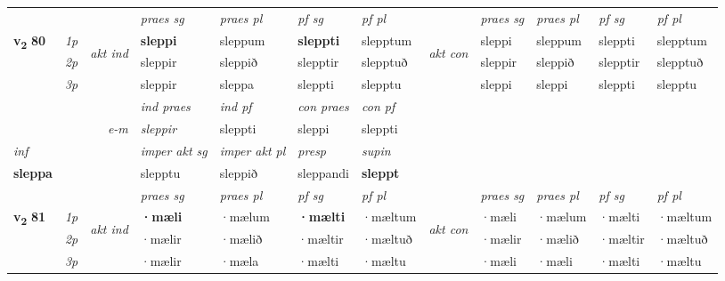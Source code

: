 \begin{longtable}[l]{X>{\footnotesize\itshape}llXXXXlXXXX}
 & &   & \textit{praes sg}  & \textit{praes pl}    & \textit{ pf sg} & \textit{pf pl} & & \textit{praes sg}  & \textit{praes pl}    & \textit{pf sg} & \textit{pf pl }  \\ \cmidrule{4-7} \cmidrule{9-12}
 \multirow{2}{*}{{{\textbf{v{\textsubscript{2}}} \Large{\textbf{80}}}}}  & 1p & \multirow{3}{*}{\begin{turn}{90}\textit{akt ind}\end{turn}} & \textbf{sleppi} & sleppum & \textbf{sleppti} & slepptum & \multirow{3}{*}{\begin{turn}{90}\textit{akt con}\end{turn}} &sleppi & sleppum & sleppti & slepptum\\*
 & 2p &  &  sleppir  & sleppið & slepptir & slepptuð & & sleppir & sleppið & slepptir & slepptuð \\*
 & 3p &  & sleppir & sleppa & sleppti & slepptu & & sleppi & sleppi& sleppti & slepptu \\*
\cmidrule{4-7} \cmidrule{9-12}

   && &  \textit{ind praes} & \textit{ind pf} & \textit{con praes} & \textit{con pf} \\*
\multicolumn{3}{r}{\textit{e-m}} & sleppir & sleppti & sleppi & sleppti \\*

\cmidrule{4-7}
   {\textit{inf}} & &  & \textit{imper akt sg} & \textit{imper akt pl}   & \textit{presp} & \textit{supin}   \\*
  {\textbf{sleppa}} & && slepptu  & sleppið   & sleppandi &  \textbf{sleppt}   \\*

\midrule

 & &   & \textit{praes sg}  & \textit{praes pl}    & \textit{ pf sg} & \textit{pf pl} & & \textit{praes sg}  & \textit{praes pl}    & \textit{pf sg} & \textit{pf pl }  \\ \cmidrule{4-7} \cmidrule{9-12}
 \multirow{2}{*}{{{\textbf{v{\textsubscript{2}}} \Large{\textbf{81}}}}}  & 1p & \multirow{3}{*}{\begin{turn}{90}\textit{akt ind}\end{turn}} & \textbf{·mæli} & ·mælum & \textbf{·mælti} & ·mæltum & \multirow{3}{*}{\begin{turn}{90}\textit{akt con}\end{turn}} &·mæli & ·mælum & ·mælti & ·mæltum\\*
 & 2p &  &  ·mælir  & ·mælið & ·mæltir & ·mæltuð & & ·mælir & ·mælið & ·mæltir & ·mæltuð \\*
 & 3p &  & ·mælir & ·mæla & ·mælti & ·mæltu & & ·mæli & ·mæli& ·mælti & ·mæltu \\*
\cmidrule{4-7} \cmidrule{9-12}


\end{longtable}
